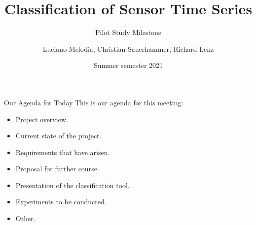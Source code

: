 \documentclass[aspectratio=169,t]{beamer}
\title[KDD]{Classification of Sensor Time Series}
\subtitle{Pilot Study Milestone}
\author[L.~Melodia]{Luciano Melodia, Christian Sauerhammer, Richard Lenz}
\institute[Department]{Evolutionary Data Management, Friedrich-Alexander University Erlangen-Nürnberg}
\date{Summer semester 2021}
\begin{document}
  \maketitle

  { 
    \begin{frame}{Our Agenda for Today}
    This is our agenda for this meeting:
        \begin{itemize}
            \item Project overview.
            \item Current state of the project.
            \item Requirements that have arisen.
            \item Proposal for further course.
            \item Presentation of the classification tool.
            \item Experiments to be conducted.
            \item Other.
        \end{itemize}
    \end{frame}
  }
\end{document}
